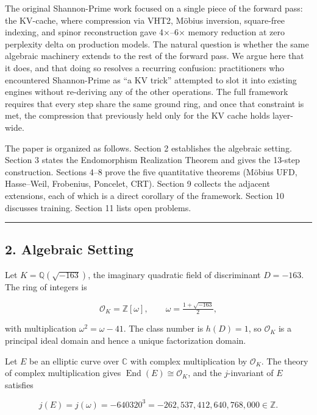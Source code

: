 \documentclass[
  11pt,
]{article}
\begin{document}
The original Shannon-Prime work focused on a single piece of the forward
pass: the KV-cache, where compression via VHT2, Möbius inversion,
square-free indexing, and spinor reconstruction gave 4×--6× memory
reduction at zero perplexity delta on production models. The natural
question is whether the same algebraic machinery extends to the rest of
the forward pass. We argue here that it does, and that doing so resolves
a recurring confusion: practitioners who encountered Shannon-Prime as
``a KV trick'' attempted to slot it into existing engines without
re-deriving any of the other operations. The full framework requires
that every step share the same ground ring, and once that constraint is
met, the compression that previously held only for the KV cache holds
layer-wide.

The paper is organized as follows. Section 2 establishes the algebraic
setting. Section 3 states the Endomorphism Realization Theorem and gives
the 13-step construction. Sections 4--8 prove the five quantitative
theorems (Möbius UFD, Hasse--Weil, Frobenius, Poncelet, CRT). Section 9
collects the adjacent extensions, each of which is a direct corollary of
the framework. Section 10 discusses training. Section 11 lists open
problems.

\begin{center}\rule{0.5\linewidth}{0.5pt}\end{center}

\hypertarget{algebraic-setting}{%
\subsection{2. Algebraic Setting}\label{algebraic-setting}}

Let \(K = \mathbb{Q}(\sqrt{-163})\), the imaginary quadratic field of
discriminant \(D = -163\). The ring of integers is

\[\mathcal{O}_K = \mathbb{Z}[\omega], \qquad \omega = \tfrac{1 + \sqrt{-163}}{2},\]

with multiplication \(\omega^2 = \omega - 41\). The class number is
\(h(D) = 1\), so \(\mathcal{O}_K\) is a principal ideal domain and hence
a unique factorization domain.

Let \(E\) be an elliptic curve over \(\mathbb{C}\) with complex
multiplication by \(\mathcal{O}_K\). The theory of complex
multiplication gives \(\operatorname{End}(E) \cong \mathcal{O}_K\), and
the \(j\)-invariant of \(E\) satisfies

\[j(E) = j(\omega) = -640320^3 = -262{,}537{,}412{,}640{,}768{,}000 \in \mathbb{Z}.\]
\end{document}
